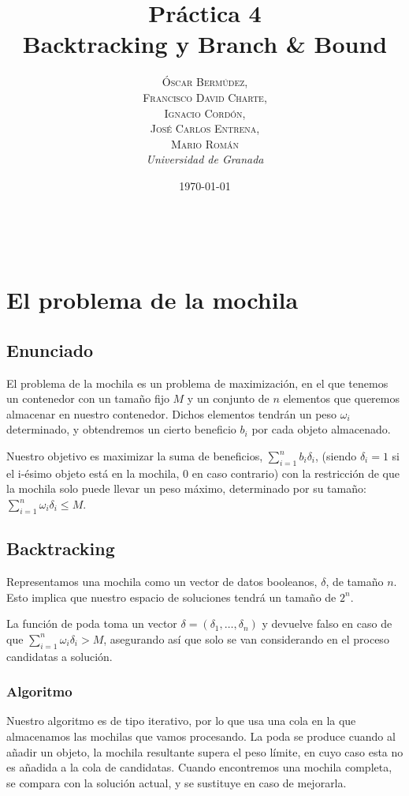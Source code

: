 \documentclass[a4paper, 11pt]{article} %
\title{\textbf{Práctica 4}\\ %
Backtracking y Branch \& Bound} %
\author{\textsc{Óscar Bermúdez,\\Francisco David Charte,\\Ignacio Cordón,\\José Carlos Entrena,\\Mario Román} %
\\{\textit{Universidad de Granada}}} %
\date{\today} %
\makeatletter
\renewcommand{\maketitle}{ %
\begin{flushright} %
{\LARGE\@title} %

\vspace{50pt} %

{\large\@author} %
\\\@date %

\vspace{40pt} %
\end{flushright}
}
\makeatother
\begin{document}
\maketitle %

\renewcommand{\abstractname}{Resumen} %
\begin{abstract}
\end{abstract}
{\parskip=2pt
\tableofcontents
}
\pagebreak


\section{El problema de la mochila}

\subsection{Enunciado}
El problema de la mochila es un problema de maximización, en el que tenemos un contenedor con un tamaño 
fijo $M$ y un conjunto de $n$ elementos que queremos almacenar en nuestro contenedor. Dichos elementos tendrán un peso $\omega_i$
determinado, y obtendremos un cierto beneficio $b_i$ por cada objeto almacenado.

Nuestro objetivo es maximizar la suma de beneficios, $\sum_{i=1}^{n} b_i\delta_i$, (siendo $\delta_i = 1$ si el i-ésimo objeto está en la mochila, 0 en caso contrario) con la restricción de que la mochila solo puede llevar un peso máximo, determinado por su tamaño: $\sum_{i=1}^{n} \omega_i\delta_i \leq M$.

  
    \subsection{Backtracking}
Representamos una mochila como un vector de datos booleanos, $\delta$, de tamaño $n$. Esto implica que nuestro espacio de soluciones tendrá un tamaño de $2^n$.

La función de poda toma un vector $\delta = (\delta_1, \dots, \delta_n)$ y devuelve falso en caso de que $\sum_{i=1}^{n} \omega_i\delta_i > M$, asegurando así que solo se van considerando en el proceso candidatas a solución.


	\subsubsection{Algoritmo}
Nuestro algoritmo es de tipo iterativo, por lo que usa una cola en la que almacenamos las mochilas que vamos procesando. La poda se produce cuando al añadir un objeto, la mochila resultante supera el peso límite, en cuyo caso esta no es añadida a la cola de candidatas. Cuando encontremos una mochila completa, se compara con la solución actual, y se sustituye en caso de mejorarla. 
\end{document}
